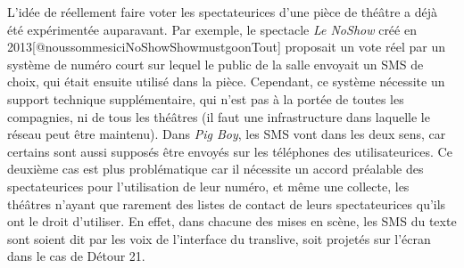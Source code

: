 \documentclass[
]{article}
\begin{document}
L'idée de réellement faire voter les spectateurices d'une pièce de théâtre a déjà été expérimentée auparavant. Par exemple, le spectacle \emph{Le NoShow} créé en 2013{[}@noussommesiciNoShowShowmustgoonTout{]} proposait un vote réel par un système de numéro court sur lequel le public de la salle envoyait un SMS de choix, qui était ensuite utilisé dans la pièce. Cependant, ce système nécessite un support technique supplémentaire, qui n'est pas à la portée de toutes les compagnies, ni de tous les théâtres (il faut une infrastructure dans laquelle le réseau peut être maintenu). Dans \emph{Pig Boy}, les SMS vont dans les deux sens, car certains sont aussi supposés être envoyés sur les téléphones des utilisateurices. Ce deuxième cas est plus problématique car il nécessite un accord préalable des spectateurices pour l'utilisation de leur numéro, et même une collecte, les théâtres n'ayant que rarement des listes de contact de leurs spectateurices qu'ils ont le droit d'utiliser. En effet, dans chacune des mises en scène, les SMS du texte sont soient dit par les voix de l'interface du translive, soit projetés sur l'écran dans le cas de Détour 21.
\end{document}
